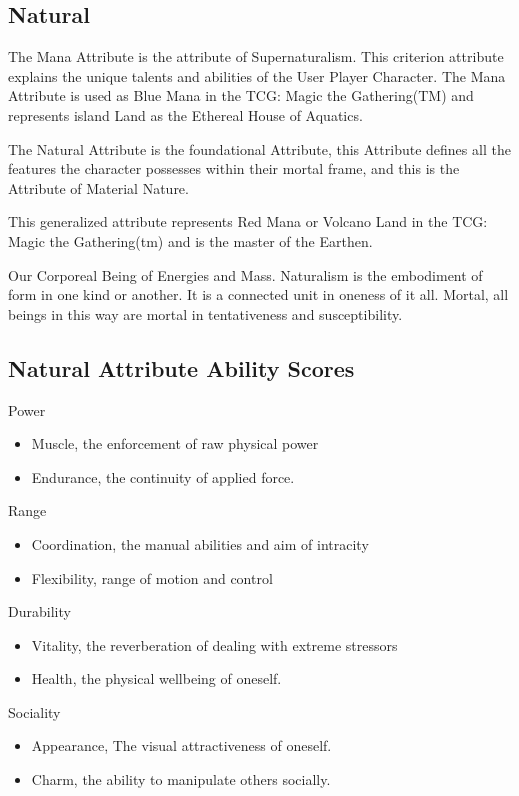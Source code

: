 \documentclass{article}
\begin{document}
\subsection{Natural}

The Mana Attribute is the attribute of Supernaturalism. This criterion attribute explains the unique talents and abilities of the User Player Character. The Mana Attribute is used as Blue Mana in the TCG: Magic the Gathering(TM) and represents island Land as the Ethereal House of Aquatics.

The Natural Attribute is the foundational Attribute, this Attribute defines all the features the character possesses within their mortal frame, and this is the Attribute of Material Nature.

This generalized attribute represents Red Mana or Volcano Land in the TCG: Magic the Gathering(tm) and is the master of the Earthen.

Our Corporeal Being of Energies and Mass. Naturalism is the embodiment of form in one kind or another. It is a connected unit in oneness of it all. Mortal, all beings in this way are mortal in tentativeness and susceptibility.

\subsection*{Natural Attribute Ability Scores}

Power
\begin{itemize}
\item Muscle, the enforcement of raw physical power
\item Endurance, the continuity of applied force.
\end{itemize}

Range
\begin{itemize}
\item Coordination, the manual abilities and aim of intracity
\item Flexibility, range of motion and control
\end{itemize}

Durability
\begin{itemize}
\item Vitality, the reverberation of dealing with extreme stressors
\item Health, the physical wellbeing of oneself.
\end{itemize}

Sociality
\begin{itemize}
\item Appearance, The visual attractiveness of oneself.
\item Charm, the ability to manipulate others socially.
\end{itemize}
\end{document}
